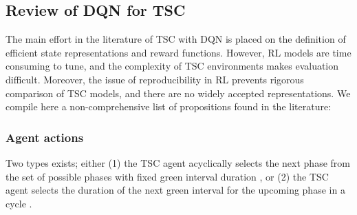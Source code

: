 \documentclass[journal]{IEEEtran}
\begin{document}
\subsection{Review of DQN for TSC}

The main effort in the literature of TSC with DQN is placed on the definition of efficient state representations and reward functions. However, RL models are time consuming to tune, and the complexity of TSC environments makes evaluation difficult. Moreover, the issue of reproducibility in RL prevents rigorous comparison of TSC models, and there are no widely accepted representations. We compile here a non-comprehensive list of propositions found in the literature: \\

\subsubsection{Agent actions} 
Two types exists; either (1) the TSC agent acyclically selects the next phase from the set of possible phases with fixed green interval duration \cite{stevens2016reinforcement,li2016traffic,gao2017adaptative,vidali2019deep,alemzadeh2020adaptative,pol2016coordinated,wei2019presslight,wei2019colight,chen2020toward,zhang2020using,zhang2019partially,genders2018evaluating,touhbi2017adaptative}, or (2) the TSC agent selects the duration of the next green interval for the upcoming phase in a cycle \cite{genders2019opensource,liang2019deep,wei2018intellilight}.
\\
\end{document}
